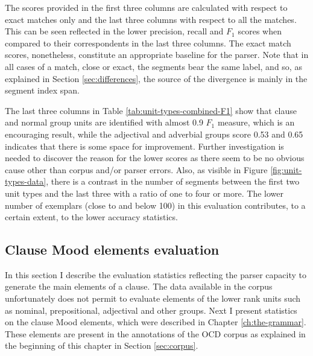     The scores provided in the first three columns are calculated with respect to exact matches only and the last three columns with respect to all the matches. This can be seen reflected in the lower precision, recall and $F_1$ scores when compared to their correspondents in the last three columns. The exact match scores, nonetheless, constitute an appropriate baseline for the parser. Note that in all cases of a match, close or exact, the segments bear the same label, and so, as explained in Section \ref{sec:differences}, the source of the divergence is mainly in the segment index span. 
    
    The last three columns in Table \ref{tab:unit-types-combined-F1} show that clause and normal group units are identified with almost 0.9 $F_1$ measure, which is an encouraging result, while the adjectival and adverbial groups score 0.53 and 0.65 indicates that there is some space for improvement. 
    Further investigation is needed to discover the reason for the lower scores as there seem to be no obvious cause other than corpus and/or parser errors. Also, as visible in Figure \ref{fig:unit-types-data}, there is a contrast in the number of segments between the first two unit types and the last three with a ratio of one to four or more. The lower number of exemplars (close to and below 100) in this evaluation contributes, to a certain extent, to the lower accuracy statistics.
    
\subsection{Clause Mood elements evaluation}
\label{sec:unit-mood-element-evaluation}

    In this section I describe the evaluation statistics reflecting the parser capacity to generate the main elements of a clause. The data available in the corpus unfortunately does not permit to evaluate elements of the lower rank units such as nominal, prepositional, adjectival and other groups. Next I present statistics on the clause Mood elements, which were described in Chapter \ref{ch:the-grammar}. These elements are present in the annotations of the OCD corpus as explained in the beginning of this chapter in Section \ref{sec:corpus}. 
    
